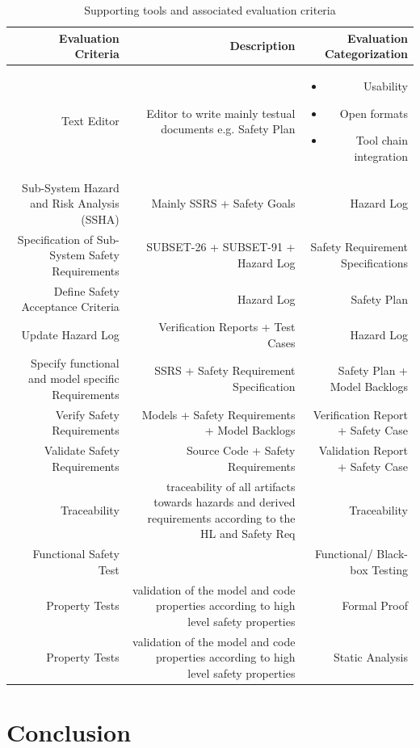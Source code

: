 \documentclass{template/openetcs_article}
\begin{document}
\begin{table}[htbp]
  \centering
  \caption{Supporting tools and associated evaluation criteria}
    \begin{tabular}{r|r|r|}
    \textbf{Evaluation Criteria} & \textbf{Description} & \textbf{Evaluation Categorization} \\
    \hline
    Text Editor & Editor to write mainly testual documents e.g. Safety Plan & \begin{itemize}
    \item Usability
    \item Open formats
    \item Tool chain integration
    \end{itemize} \\ 
     Sub-System Hazard and Risk Analysis (SSHA) & Mainly SSRS + Safety Goals & Hazard Log \\ 
     Specification of Sub-System Safety Requirements & SUBSET-26 + SUBSET-91 + Hazard Log  & Safety Requirement Specifications \\ 
     Define Safety Acceptance Criteria & Hazard Log & Safety Plan  \\ 
     Update Hazard Log & Verification Reports + Test Cases & Hazard Log \\
     Specify functional and model specific Requirements & SSRS + Safety Requirement Specification & Safety Plan + Model Backlogs\\
     Verify Safety Requirements & Models + Safety Requirements + Model Backlogs & Verification Report + Safety Case \\
     Validate Safety Requirements & Source Code + Safety Requirements & Validation Report + Safety Case \\
    
    Traceability & traceability of all artifacts towards hazards and derived requirements according to the HL and Safety Req & Traceability \\
    Functional Safety Test &       & Functional/ Black-box Testing \\
    Property Tests & validation of the model and code properties according to high level safety properties & Formal Proof \\
    Property Tests & validation of the model and code properties according to high level safety properties & Static Analysis \\
    \end{tabular}%
  \label{ToolEvalCrit}%
\end{table}%


\section{Conclusion}

\nocite{*} 






\begin{thebibliography}{9}



\end{thebibliography}

\end{document}
